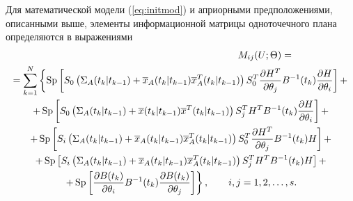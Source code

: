 \documentclass[a4paper,14pt]{extarticle}
\DeclareMathOperator{\Sp}{Sp}
\newcommand{\pd}[2]{\frac{\partial #1}{\partial #2}}
\newcommand{\inv}[1]{#1^{-1}}
\begin{document}
\newcommand{\pred}[0]{t_{k}|t_{k-1}}
\newcommand{\est}[0]{t_k|t_k}
\newcommand{\fut}[0]{t_{k+1}}
\newcommand{\upd}[0]{t_{k+1}|t_{k+1}}
\newcommand{\ol}[1]{\overline{#1}}
\newcommand{\Th}[0]{\Theta}

\newcommand{\sumlim}[2]{\sum\limits_{#1}^{#2}}

Для математической модели (\ref{eq:initmod}) и априорными предположениями,
описанными выше, элементы информационной матрицы одноточечного плана
определяются в выражениями
\begin{multline}
	\label{eq:fim}
	\hspace{0.5\textwidth} M_{ij}(U;\Th) =\\
		= \sumlim{k=1}{N} \left\{ \Sp \left[ 
		S_0 \left(\Sigma_A(\pred) + \ol{x}_A(\pred) \ol{x}^T_A(\pred) \right)
		S_0^T \pd{H^T}{\theta_j} \inv{B}(t_k) \pd{H}{\theta_i} \right] + \right. \\
		\left.
		+ \Sp\left[ S_0 \left( \Sigma_A(\pred) + \ol{x}(\pred)
		\ol{x}^T(\pred) \right) S_j^T H^T \inv{B}(t_k) \pd{H}{\theta_i}
		\right] + \right. \\ \left.
		+ \Sp\left[ S_i \left( \Sigma_A(\pred) + \ol{x}_A(\pred) \ol{x}^T_A(\pred)
		\right) S_0^T \pd{H^T}{\theta_j} \inv{B}(t_k) H \right] + \right. \\ \left.
		+ \Sp \left[ S_i \left( \Sigma_A(\pred) + \ol{x}_A(\pred) \ol{x}^T_A(\pred)
		\right) S_j^T H^T \inv{B}(t_k) H \right] + \right. \\ \left.
		+ \Sp \left[ \pd{B(t_k)}{\theta_i} \inv{B}(t_k) \pd{B(t_k)}{\theta_j} 
		\right]  \right\},\qquad i,j = 1,2,\ldots,s.
\end{multline}
\end{document}
